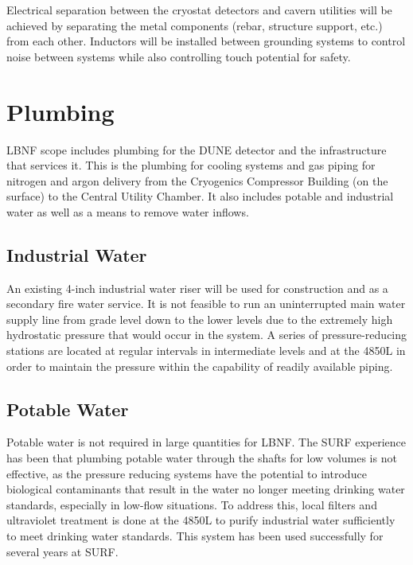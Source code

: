 Electrical separation between the cryostat detectors and cavern utilities will be achieved by separating the metal components (rebar, structure support, etc.) from each other. Inductors will be installed between grounding systems to control noise between systems while also controlling touch potential for safety.

\section{Plumbing}
\label{sec:fscf-und-plumbing}

LBNF scope includes plumbing for the DUNE detector and the infrastructure that services it. This is the plumbing for cooling systems and gas
 piping for nitrogen and argon delivery from the Cryogenics Compressor Building (on the surface) to the Central Utility Chamber. It also includes potable and industrial water as well as a means to remove water inflows.
 
\subsection{Industrial Water}
\label{sec:fscf-und-ind-h2o}

An existing 4-inch industrial water riser will be used for construction and as a secondary fire water service. It is not feasible to run an uninterrupted main water supply line from grade level down to %
the lower levels due to the extremely high hydrostatic pressure that would occur in the system. A series of pressure-reducing stations are located at regular intervals in intermediate levels and at the 4850L in order to maintain the pressure within the capability of readily available piping.

\subsection{Potable Water}
\label{sec:fscf-und-pot-h2o}

Potable water is not required in large quantities for LBNF. The SURF experience has been that plumbing potable water through the shafts for low volumes is not effective, as the pressure reducing systems have the potential to introduce biological contaminants that result in the water no longer meeting drinking water standards, especially in low-flow situations. To address this, local filters and ultraviolet treatment is done at the 4850L to purify industrial water sufficiently to meet drinking water standards. This system has been used successfully for several years at SURF.

